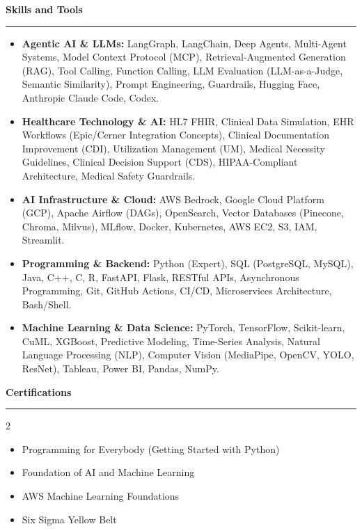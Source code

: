 \documentclass[9pt,letterpaper]{article} %
\makeatletter
\newenvironment{rSection}[1]{ %
  \sectionskip
 \textbf{\Large #1} %
  \sectionlineskip
  \hrule\nopagebreak[4] %
  \begin{list}{}{ %
    \setlength{\leftmargin}{-0em} %
    \@beginparpenalty=10000
    \@itempenalty=10000
  }
  \item[]\nopagebreak[4]
}{
  \end{list}
}
\def\sectionlineskip{\smallskip} %
\def\sectionskip{} %
\makeatother
\begin{document}
\begin{rSection}{Skills and Tools}
\begin{itemize}[left=-1.5em, labelsep=.1cm, labelwidth=.2cm, itemsep=0.0em, topsep=0pt]
\item \textbf{Agentic AI \& LLMs:} LangGraph, LangChain, Deep Agents, Multi-Agent Systems, Model Context Protocol (MCP), Retrieval-Augmented Generation (RAG), Tool Calling, Function Calling, LLM Evaluation (LLM-as-a-Judge, Semantic Similarity), Prompt Engineering, Guardrails, Hugging Face, Anthropic Claude Code, Codex.
\item \textbf{Healthcare Technology \& AI:} HL7 FHIR, Clinical Data Simulation, EHR Workflows (Epic/Cerner Integration Concepts), Clinical Documentation Improvement (CDI), Utilization Management (UM), Medical Necessity Guidelines, Clinical Decision Support (CDS), HIPAA-Compliant Architecture, Medical Safety Guardrails.
\item \textbf{AI Infrastructure \& Cloud:} AWS Bedrock, Google Cloud Platform (GCP), Apache Airflow (DAGs), OpenSearch, Vector Databases (Pinecone, Chroma, Milvus), MLflow, Docker, Kubernetes, AWS EC2, S3, IAM, Streamlit.
\item \textbf{Programming \& Backend:} Python (Expert), SQL (PostgreSQL, MySQL), Java, C++, C, R, FastAPI, Flask, RESTful APIs, Asynchronous Programming, Git, GitHub Actions, CI/CD, Microservices Architecture, Bash/Shell.
\item \textbf{Machine Learning \& Data Science:} PyTorch, TensorFlow, Scikit-learn, CuML, XGBoost, Predictive Modeling, Time-Series Analysis, Natural Language Processing (NLP), Computer Vision (MediaPipe, OpenCV, YOLO, ResNet), Tableau, Power BI, Pandas, NumPy.
\end{itemize}
\end{rSection}%
\begin{rSection}{Certifications}
\begin{multicols}{2}
\begin{itemize}[left=-1.5em, labelsep=.1cm, labelwidth=.2cm, itemsep=0.0em, topsep=0pt]
\item Programming for Everybody (Getting Started with Python)
\item Foundation of AI and Machine Learning
\item AWS Machine Learning Foundations
\item Six Sigma Yellow Belt
\end{itemize}
\end{multicols}
\end{rSection}
\end{document}
